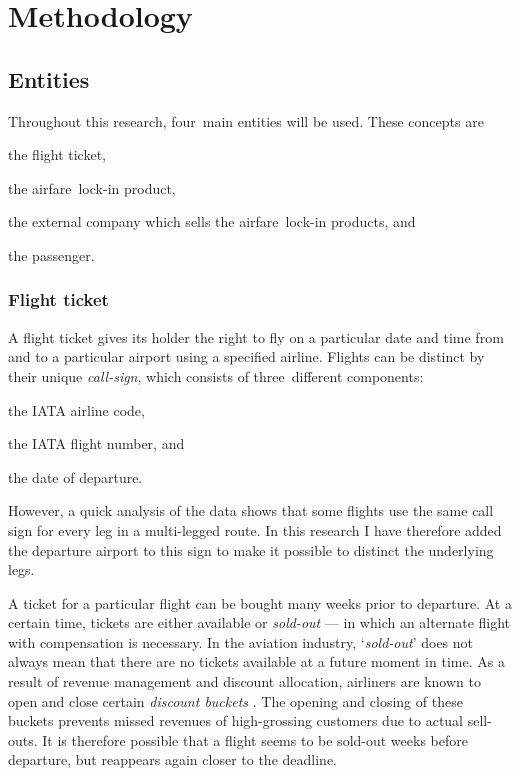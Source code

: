 \chapter{Methodology}
\label{chap:Methodology}
\section{Entities}
\label{sec:Entities}
Throughout this research, four~main entities will be used. These concepts are \begin{inparaenum}
\item the flight ticket,
\item the airfare~lock-in product,
\item the external company which sells the airfare~lock-in products, and
\item the passenger.
\end{inparaenum}

\subsection{Flight ticket}
\label{subsec:FlightTicket}
A flight ticket gives its holder the right to fly on a particular date and time from and to a particular airport using a specified airline. Flights can be distinct by their unique \emph{call-sign}, which consists of three~different components: \begin{inparaenum}
\item the IATA airline code,
\item the IATA flight number, and
\item the date of departure.
\end{inparaenum} However, a quick analysis of the data shows that some flights use the same call sign for every leg in a multi-legged route. In this research I have therefore added the departure airport to this sign to make it possible to distinct the underlying legs.

A ticket for a particular flight can be bought many weeks prior to departure. At a certain time, tickets are either available or \emph{sold-out} --- in which an alternate flight with compensation is necessary. In the aviation industry, `\emph{sold-out}' does not always mean that there are no tickets available at a future moment in time. As a result of revenue management and discount allocation, airliners are known to open and close certain \emph{discount buckets} \cite{mcgill1999revenue}. The opening and closing of these buckets prevents missed revenues of high-grossing customers due to actual sell-outs. It is therefore possible that a flight seems to be sold-out weeks before departure, but reappears again closer to the deadline.

